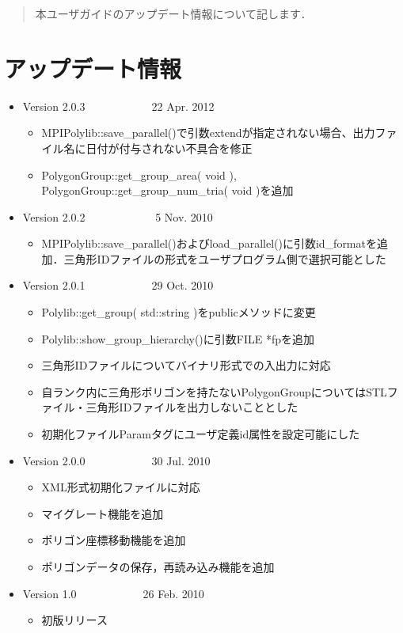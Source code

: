 \begin{abstract}
本ユーザガイドのアップデート情報について記します．
\end{abstract}

%
\section{アップデート情報}

\begin{itemize}
	\item Version 2.0.3　　　　　　22 Apr. 2012
	\begin{itemize}
		\item MPIPolylib::save\_parallel()で引数extendが指定されない場合、出力ファイル名に日付が付与されない不具合を修正
		\item PolygonGroup::get\_group\_area( void ), PolygonGroup::get\_group\_num\_tria( void )を追加
	\end{itemize}
\vspace{3mm}

	\item Version 2.0.2　　　　　　 5 Nov. 2010
	\begin{itemize}
		\item MPIPolylib::save\_parallel()およびload\_parallel()に引数id\_formatを追加．三角形IDファイルの形式をユーザプログラム側で選択可能とした
	\end{itemize}
\vspace{3mm}

	\item Version 2.0.1　　　　　　29 Oct. 2010
	\begin{itemize}
		\item Polylib::get\_group( std::string )をpublicメソッドに変更
		\item Polylib::show\_group\_hierarchy()に引数FILE *fpを追加
		\item 三角形IDファイルについてバイナリ形式での入出力に対応
		\item 自ランク内に三角形ポリゴンを持たないPolygonGroupについてはSTLファイル・三角形IDファイルを出力しないこととした
		\item 初期化ファイルParamタグにユーザ定義id属性を設定可能にした
	\end{itemize}
\vspace{3mm}

	\item Version 2.0.0　　　　　　30 Jul. 2010
	\begin{itemize}
		\item XML形式初期化ファイルに対応
		\item マイグレート機能を追加
		\item ポリゴン座標移動機能を追加
		\item ポリゴンデータの保存，再読み込み機能を追加
	\end{itemize}

\vspace{3mm}

	\item Version 1.0　　　　　　26 Feb. 2010
	\begin{itemize}
		\item 初版リリース
	\end{itemize}
\end{itemize}